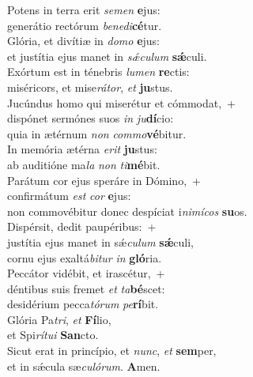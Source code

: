 \evenverse Potens in terra erit \textit{se}\textit{men} \textbf{e}jus:~\*\\
\evenverse generátio rectórum \textit{be}\textit{ne}\textit{di}\textbf{cé}tur.\\
\oddverse Glória, et divítiæ in \textit{do}\textit{mo} \textbf{e}jus:~\*\\
\oddverse et justítia ejus manet in \textit{sǽ}\textit{cu}\textit{lum} \textbf{sǽ}culi.\\
\evenverse Exórtum est in ténebris \textit{lu}\textit{men} \textbf{re}ctis:~\*\\
\evenverse miséricors, et mise\textit{rá}\textit{tor}, \textit{et} \textbf{ju}stus.\\
\oddverse Jucúndus homo qui miserétur et cómmodat,~+\\
\oddverse  dispónet sermónes suos \textit{in} \textit{ju}\textbf{dí}cio:~\*\\
\oddverse quia in ætérnum \textit{non} \textit{com}\textit{mo}\textbf{vé}bitur.\\
\evenverse In memória ætérna \textit{e}\textit{rit} \textbf{ju}stus:~\*\\
\evenverse ab auditióne ma\textit{la} \textit{non} \textit{ti}\textbf{mé}bit.\\
\oddverse Parátum cor ejus speráre in Dómino,~+\\
\oddverse  confirmátum \textit{est} \textit{cor} \textbf{e}jus:~\*\\
\oddverse non commovébitur donec despíciat i\textit{ni}\textit{mí}\textit{cos} \textbf{su}os.\\
\evenverse Dispérsit, dedit paupéribus:~+\\
\evenverse  justítia ejus manet in sǽ\textit{cu}\textit{lum} \textbf{sǽ}culi,~\*\\
\evenverse cornu ejus exaltá\textit{bi}\textit{tur} \textit{in} \textbf{gló}ria.\\
\oddverse Peccátor vidébit, et irascétur,~+\\
\oddverse  déntibus suis fremet \textit{et} \textit{ta}\textbf{bé}scet:~\*\\
\oddverse desidérium pecca\textit{tó}\textit{rum} \textit{pe}\textbf{rí}bit.\\
\evenverse Glória Pa\textit{tri}, \textit{et} \textbf{Fí}lio,~\*\\
\evenverse et Spi\textit{rí}\textit{tu}\textit{i} \textbf{San}cto.\\
\oddverse Sicut erat in princípio, et \textit{nunc}, \textit{et} \textbf{sem}per,~\*\\
\oddverse et in sǽcula sæ\textit{cu}\textit{ló}\textit{rum}. \textbf{A}men.\\
